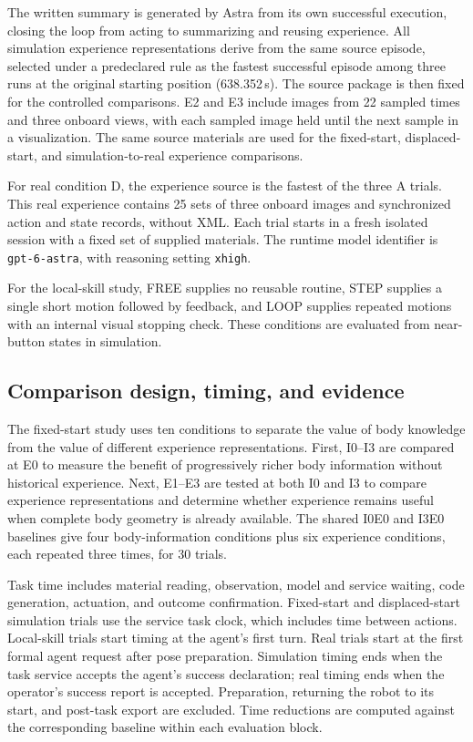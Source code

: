 \documentclass[11pt]{article}
\begin{document}
The written summary is generated by Astra from its own successful execution, closing the loop from acting to summarizing and reusing experience. All simulation experience representations derive from the same source episode, selected under a predeclared rule as the fastest successful episode among three runs at the original starting position (638.352\,s). The source package is then fixed for the controlled comparisons. E2 and E3 include images from 22 sampled times and three onboard views, with each sampled image held until the next sample in a visualization. The same source materials are used for the fixed-start, displaced-start, and simulation-to-real experience comparisons.

For real condition D, the experience source is the fastest of the three A trials. This real experience contains 25 sets of three onboard images and synchronized action and state records, without XML. Each trial starts in a fresh isolated session with a fixed set of supplied materials. The runtime model identifier is \texttt{gpt-6-astra}, with reasoning setting \texttt{xhigh}.

For the local-skill study, FREE supplies no reusable routine, STEP supplies a single short motion followed by feedback, and LOOP supplies repeated motions with an internal visual stopping check. These conditions are evaluated from near-button states in simulation.



\subsection{Comparison design, timing, and evidence}
The fixed-start study uses ten conditions to separate the value of body knowledge from the value of different experience representations. First, I0--I3 are compared at E0 to measure the benefit of progressively richer body information without historical experience. Next, E1--E3 are tested at both I0 and I3 to compare experience representations and determine whether experience remains useful when complete body geometry is already available. The shared I0E0 and I3E0 baselines give four body-information conditions plus six experience conditions, each repeated three times, for 30 trials.

Task time includes material reading, observation, model and service waiting, code generation, actuation, and outcome confirmation. Fixed-start and displaced-start simulation trials use the service task clock, which includes time between actions. Local-skill trials start timing at the agent's first turn. Real trials start at the first formal agent request after pose preparation. Simulation timing ends when the task service accepts the agent's success declaration; real timing ends when the operator's success report is accepted. Preparation, returning the robot to its start, and post-task export are excluded. Time reductions are computed against the corresponding baseline within each evaluation block.
\end{document}
